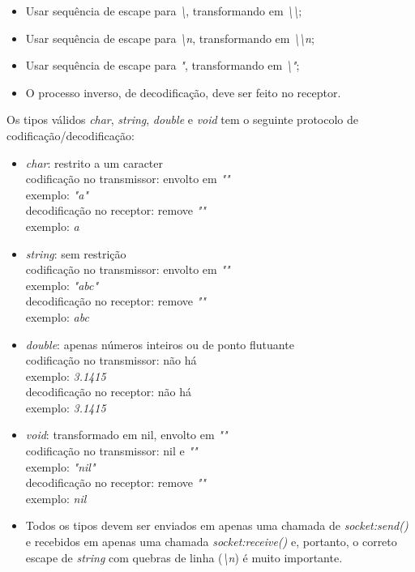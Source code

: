 \documentclass[11pt]{article}
\begin{document}
\begin{itemize}
\item
Usar sequência de escape para \textit{\textbackslash{}}, transformando em \textit{\textbackslash{}\textbackslash{}};
\item
Usar sequência de escape para \textit{\textbackslash{}n}, transformando em \textit{\textbackslash{}\textbackslash{}n};
\item
Usar sequência de escape para \textit{"}, transformando em \textit{\textbackslash{}"};
\item
O processo inverso, de decodificação, deve ser feito no receptor.
\end{itemize}

Os tipos válidos \textit{char}, \textit{string}, \textit{double} e
\textit{void} tem o seguinte protocolo de codificação/decodificação:

\begin{itemize}
\item
\textit{char}: restrito a um caracter \\
codificação no transmissor: envolto em \textit{""} \\
exemplo: \textit{"a"} \\
decodificação no receptor: remove \textit{""} \\
exemplo: \textit{a}
\item
\textit{string}: sem restrição \\
codificação no transmissor: envolto em \textit{""} \\
exemplo: \textit{"abc"} \\
decodificação no receptor: remove \textit{""} \\
exemplo: \textit{abc}
\item
\textit{double}: apenas números inteiros ou de ponto flutuante \\
codificação no transmissor: não há \\
exemplo: \textit{3.1415} \\
decodificação no receptor: não há \\
exemplo: \textit{3.1415}
\item
\textit{void}: transformado em nil, envolto em \textit{""} \\
codificação no transmissor: nil e \textit{""} \\
exemplo: \textit{"nil"} \\
decodificação no receptor: remove \textit{""} \\
exemplo: \textit{nil}
\item
Todos os tipos devem ser enviados em apenas uma chamada de
\textit{socket:send()} e recebidos em apenas uma chamada
\textit{socket:receive()} e, portanto, o correto escape de \textit{string} com
quebras de linha (\textit{\textbackslash{}n}) é muito importante.
\end{itemize}
\end{document}
